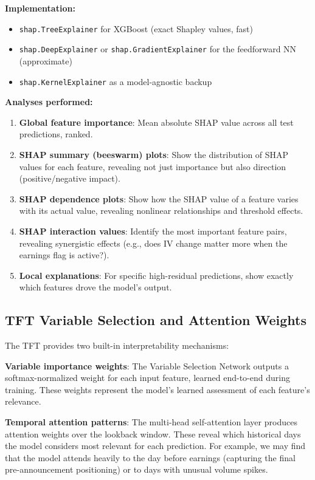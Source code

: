 \documentclass[11pt,a4paper]{article}
\begin{document}
\textbf{Implementation:}
\begin{itemize}[nosep]
    \item \texttt{shap.TreeExplainer} for XGBoost (exact Shapley values, fast)
    \item \texttt{shap.DeepExplainer} or \texttt{shap.GradientExplainer} for the feedforward NN (approximate)
    \item \texttt{shap.KernelExplainer} as a model-agnostic backup
\end{itemize}

\textbf{Analyses performed:}
\begin{enumerate}[nosep]
    \item \textbf{Global feature importance}: Mean absolute SHAP value across all test predictions, ranked.
    \item \textbf{SHAP summary (beeswarm) plots}: Show the distribution of SHAP values for each feature, revealing not just importance but also direction (positive/negative impact).
    \item \textbf{SHAP dependence plots}: Show how the SHAP value of a feature varies with its actual value, revealing nonlinear relationships and threshold effects.
    \item \textbf{SHAP interaction values}: Identify the most important feature pairs, revealing synergistic effects (e.g., does IV change matter more when the earnings flag is active?).
    \item \textbf{Local explanations}: For specific high-residual predictions, show exactly which features drove the model's output.
\end{enumerate}

\subsection{TFT Variable Selection and Attention Weights}

The TFT provides two built-in interpretability mechanisms:

\textbf{Variable importance weights}: The Variable Selection Network outputs a softmax-normalized weight for each input feature, learned end-to-end during training. These weights represent the model's learned assessment of each feature's relevance.

\textbf{Temporal attention patterns}: The multi-head self-attention layer produces attention weights over the lookback window. These reveal which historical days the model considers most relevant for each prediction. For example, we may find that the model attends heavily to the day before earnings (capturing the final pre-announcement positioning) or to days with unusual volume spikes.
\end{document}
